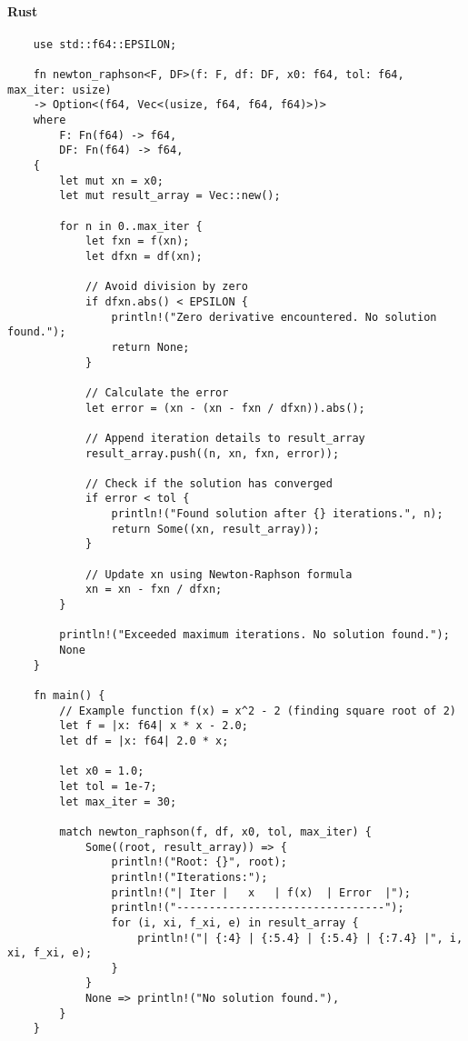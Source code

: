 \documentclass{article}
\begin{document}
            \paragraph{Rust}
                \begin{verbatim}
    use std::f64::EPSILON;

    fn newton_raphson<F, DF>(f: F, df: DF, x0: f64, tol: f64, max_iter: usize)
    -> Option<(f64, Vec<(usize, f64, f64, f64)>)>
    where
        F: Fn(f64) -> f64,
        DF: Fn(f64) -> f64,
    {
        let mut xn = x0;
        let mut result_array = Vec::new();

        for n in 0..max_iter {
            let fxn = f(xn);
            let dfxn = df(xn);

            // Avoid division by zero
            if dfxn.abs() < EPSILON {
                println!("Zero derivative encountered. No solution found.");
                return None;
            }

            // Calculate the error
            let error = (xn - (xn - fxn / dfxn)).abs();

            // Append iteration details to result_array
            result_array.push((n, xn, fxn, error));

            // Check if the solution has converged
            if error < tol {
                println!("Found solution after {} iterations.", n);
                return Some((xn, result_array));
            }

            // Update xn using Newton-Raphson formula
            xn = xn - fxn / dfxn;
        }

        println!("Exceeded maximum iterations. No solution found.");
        None
    }

    fn main() {
        // Example function f(x) = x^2 - 2 (finding square root of 2)
        let f = |x: f64| x * x - 2.0;
        let df = |x: f64| 2.0 * x;

        let x0 = 1.0;
        let tol = 1e-7;
        let max_iter = 30;

        match newton_raphson(f, df, x0, tol, max_iter) {
            Some((root, result_array)) => {
                println!("Root: {}", root);
                println!("Iterations:");
                println!("| Iter |   x   | f(x)  | Error  |");
                println!("--------------------------------");
                for (i, xi, f_xi, e) in result_array {
                    println!("| {:4} | {:5.4} | {:5.4} | {:7.4} |", i, xi, f_xi, e);
                }
            }
            None => println!("No solution found."),
        }
    }
                \end{verbatim}
\end{document}
